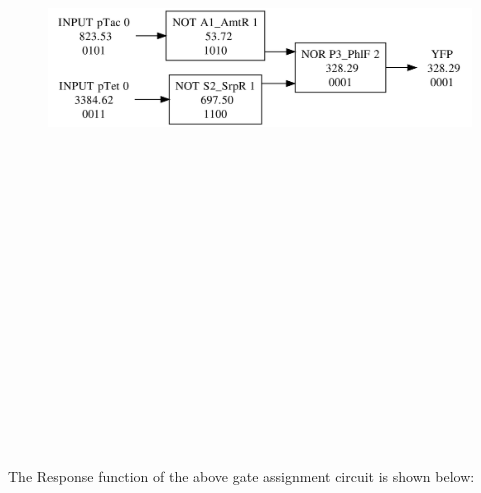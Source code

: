 \documentclass[11pt]{article}
\begin{document}
\begin{figure}[ht!]
\centering
\includegraphics[width=16cm,height=16cm,keepaspectratio]{download.png}
\label{Case exmaple}
\end{figure}
\\[\baselineskip]   
\\[\baselineskip]   
\\[\baselineskip]   
\\[\baselineskip]   
The Response function of the above gate assignment circuit is shown below:
\\[\baselineskip]   
\end{document}
